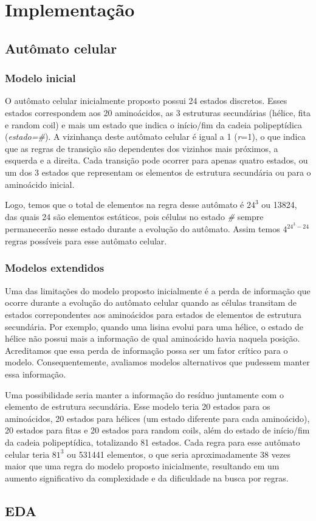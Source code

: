 \chapter{Implementação}

\section{Autômato celular}

\subsection{Modelo inicial}

O autômato celular inicialmente proposto possui 24 estados discretos. Esses estados correspondem aos 20 aminoácidos, as 3 estruturas secundárias (hélice, fita e random coil) e mais um estado que indica o início/fim da cadeia polipeptídica (\textit{estado=\#}). A vizinhança deste autômato celular é igual a 1 (\textit{r}=1),  o que indica que as regras de transição são dependentes dos vizinhos mais próximos, a esquerda e a direita. Cada transição pode ocorrer para apenas quatro estados, ou um dos 3 estados que representam os elementos de estrutura secundária ou para o aminoácido inicial.

Logo, temos que o total de elementos na regra desse autômato é $24^3$ ou 13824, das quais 24 são elementos estáticos, pois células no estado \textit{\#} sempre permanecerão nesse estado durante a evolução do autômato. Assim temos $4^{24^3-24}$ regras possíveis para esse autômato celular.

\subsection{Modelos extendidos}

Uma das limitações do modelo proposto inicialmente é a perda de informação que ocorre durante a evolução do autômato celular quando as células transitam de estados correpondentes aos aminoácidos para estados de elementos de estrutura secundária. Por exemplo, quando uma lisina evolui para uma hélice, o estado de hélice não possui mais a informação de qual aminoácido havia naquela posição. Acreditamos que essa perda de informação possa ser um fator crítico para o modelo. Consequentemente, avaliamos modelos alternativos que pudessem manter essa informação. 

Uma possibilidade seria manter a informação do resíduo juntamente com o elemento de estrutura secundária. Esse modelo teria 20 estados para os aminoácidos, 20 estados para hélices (um estado diferente para cada aminoácido), 20 estados para fitas e 20 estados para random coils, além do estado de início/fim da cadeia polipeptídica, totalizando 81 estados. Cada regra para esse autômato celular teria $81^3$  ou 531441 elementos, o que seria aproximadamente 38 vezes maior que uma regra do modelo proposto inicialmente, resultando em um aumento significativo da complexidade e da dificuldade na busca por regras.


\section{EDA}